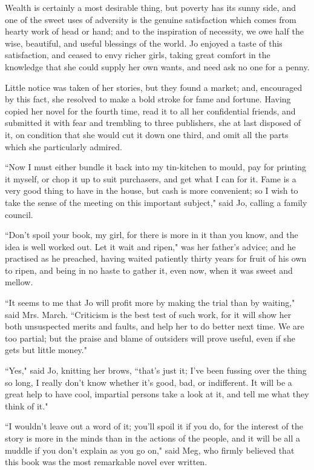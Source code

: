 Wealth is certainly a most desirable thing, but poverty has its sunny
side, and one of the sweet uses of adversity is the genuine satisfaction
which comes from hearty work of head or hand; and to the inspiration of
necessity, we owe half the wise, beautiful, and useful blessings of the
world. Jo enjoyed a taste of this satisfaction, and ceased to envy
richer girls, taking great comfort in the knowledge that she could
supply her own wants, and need ask no one for a penny.

Little notice was taken of her stories, but they found a market; and,
encouraged by this fact, she resolved to make a bold stroke for fame and
fortune. Having copied her novel for the fourth time, read it to all her
confidential friends, and submitted it with fear and trembling to three
publishers, she at last disposed of it, on condition that she would cut
it down one third, and omit all the parts which she particularly
admired.

``Now I must either bundle it back into my tin-kitchen to mould, pay for
printing it myself, or chop it up to suit purchasers, and get what I can
for it. Fame is a very good thing to have in the house, but cash is more
convenient; so I wish to take the sense of the meeting on this important
subject," said Jo, calling a family council.

``Don't spoil your book, my girl, for there is more in it
than you know, and the idea is well worked out. Let it wait and ripen,"
was her father's advice; and he practised as he
preached, having waited patiently thirty years for fruit of his own to
ripen, and being in no haste to gather it, even now, when it was sweet
and mellow.

``It seems to me that Jo will profit more by making the trial than by
waiting," said Mrs. March. ``Criticism is the best test of such work, for
it will show her both unsuspected merits and faults, and help her to do
better next time. We are too partial; but the praise and blame of
outsiders will prove useful, even if she gets but little money."

``Yes," said Jo, knitting her brows, ``that's just it;
I've been fussing over the thing so long, I really
don't know whether it's good, bad, or
indifferent. It will be a great help to have cool, impartial persons
take a look at it, and tell me what they think of it."

``I wouldn't leave out a word of it;
you'll spoil it if you do, for the interest of the story
is more in the minds than in the actions of the people, and it will be
all a muddle if you don't explain as you go on," said
Meg, who firmly believed that this book was the most remarkable novel
ever written.

